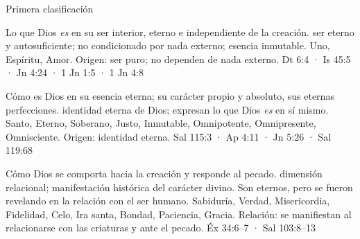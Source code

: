 \begin{frame}{Primera clasificación}
\end{frame}

 {Lo que Dios \emph{es} en su ser interior, eterno e independiente de la creación.}
 {ser eterno y autosuficiente; no condicionado por nada externo; esencia inmutable.}
 {Uno, Espíritu, Amor.}
 {Origen: ser puro; no dependen de nada externo.}
 {Dt 6:4 · Is 45:5 · Jn 4:24 · 1 Jn 1:5 · 1 Jn 4:8}

 {Cómo es Dios en su esencia eterna; su carácter propio y absoluto, sus eternas perfecciones.}
 {identidad eterna de Dios; expresan lo que Dios \emph{es} en sí mismo.}
 {Santo, Eterno, Soberano, Justo, Inmutable, Omnipotente, Omnipresente, Omnisciente.}
 {Origen: identidad eterna.}
 {Sal 115:3 · Ap 4:11 · Jn 5:26 · Sal 119:68}

 {Cómo Dios se comporta hacia la creación y responde al pecado.}
 {dimensión relacional; manifestación histórica del carácter divino. Son eternos, pero se fueron revelando en la relación con el ser humano.}
 {Sabiduría, Verdad, Misericordia, Fidelidad, Celo, Ira santa, Bondad, Paciencia, Gracia.}
 {Relación: se manifiestan al relacionarse con las criaturas y ante el pecado.}
 {Éx 34:6–7 · Sal 103:8–13}

